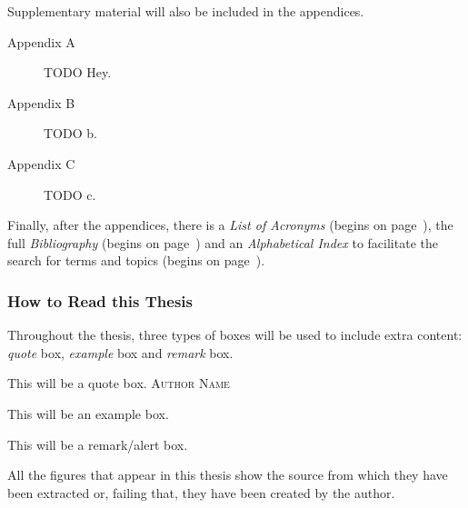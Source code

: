 Supplementary material will also be included in the appendices.

\begin{description}
  \item [Appendix A] TODO Hey. 
  \item [Appendix B] TODO b. 
  \item [Appendix C] TODO c. 
\end{description}

Finally, after the appendices, there is a \textsl{List of Acronyms} (begins on
page~\pageref{cha:acronyms}), the full \textsl{Bibliography} (begins on
page~\pageref{cha:references}) and an \textsl{Alphabetical Index} to facilitate
the search for terms and topics (begins on page~\pageref{cha:index}).

\subsubsection{How to Read this Thesis}

Throughout the thesis, three types of boxes will be used to include extra
content: \emph{quote} box, \emph{example} box and \emph{remark} box.

\begin{quoteBox}
  This will be a quote box.
  \tcblower\textsc{Author Name}
\end{quoteBox}

\begin{exampleBox}
  This will be an example box.
\end{exampleBox}

\begin{remarkBox}
  This will be a remark/alert box.
\end{remarkBox}

All the figures that appear in this thesis show the source from which they have
been extracted or, failing that, they have been created by the author.
